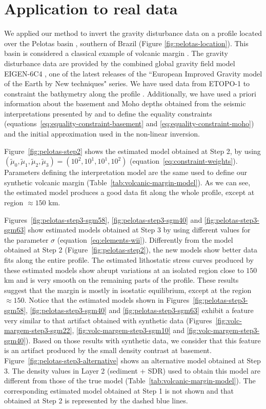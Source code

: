 \documentclass[manuscript]{geophysics}
\begin{document}
\section{Application to real data}

We applied our method to invert the gravity disturbance data 
on a profile located over the Pelotas basin
\citep{stica-etal2014}, southern of Brazil (Figure \ref{fig:pelotas-location}). This basin is 
considered a classical example of volcanic margin \citep{geoffroy2005}.
The gravity disturbance data are provided by the combined global gravity field model EIGEN-6C4
\citep{forste2014}, one of the latest releases of the ``European Improved Gravity model of 
the Earth by New techniques" series.
We have used data from ETOPO-1 to constraint the bathymetry along the profile
\citep{amante-eakins2009}.
Additionally, we have used a priori information about the basement and Moho depths
obtained from the seismic interpretations presented by \citet{stica-etal2014} and
\citet{zalan2015} to define the equality constraints 
(equations~\ref{eq:equality-constraint-basement} and \ref{eq:equality-constraint-moho})
and the initial approximation used in the non-linear inversion. 

Figure~\ref{fig:pelotas-step2} shows the estimated model obtained at Step 2,
by using $(\tilde{\mu}_{0}, \tilde{\mu}_{1}, \tilde{\mu}_{2}, \tilde{\mu}_{3}) 
= (10^{2}, 10^{1}, 10^{1}, 10^{2})$ (equation~\ref{eq:constraint-weights}).
Parameters defining the interpretation model are the same used
to define our synthetic volcanic margin (Table~\ref{tab:volcanic-margin-model}).
As we can see, the estimated model produces a good data fit along the whole
profile, except at region $\approx 150$ km.

Figures~\ref{fig:pelotas-step3-sgm58}, \ref{fig:pelotas-step3-sgm40} and 
\ref{fig:pelotas-step3-sgm63} show estimated models obtained at
Step 3 by using different values for the parameter $\sigma$
(equation~\ref{eq:elements-wii}).
Differently from the model obtained at Step 2 (Figure~\ref{fig:pelotas-step2}), 
the new models show better data fits along the entire profile.
The estimated lithostatic stress curves produced by these estimated models 
show abrupt variations at an isolated region close to $150$ km and is very smooth on the remaining parts
of the profile. These results suggest that the margin is mostly in isostatic 
equilibrium, except at the region $\approx 150$.
Notice that the estimated models shown in Figures~\ref{fig:pelotas-step3-sgm58}, 
\ref{fig:pelotas-step3-sgm40} and \ref{fig:pelotas-step3-sgm63} exhibit a feature
very similar to that artifact obtained with synthetic data 
(Figures~\ref{fig:volc-margem-step3-sgm22}, \ref{fig:volc-margem-step3-sgm10} and 
\ref{fig:volc-margem-step3-sgm40}). Based on those results with synthetic data, 
we consider that this feature is an artifact produced by the small
density contrast at basement.
Figure~\ref{fig:pelotas-step3-alternative} shows an alternative 
model obtained at Step 3.
The density values in Layer 2 (sediment + SDR) used to obtain this model 
are different from those of the true model (Table~\ref{tab:volcanic-margin-model}).
The corresponding estimated model obtained at Step 1 is not shown and
that obtained at Step 2 is represented by the dashed blue lines.
\end{document}
